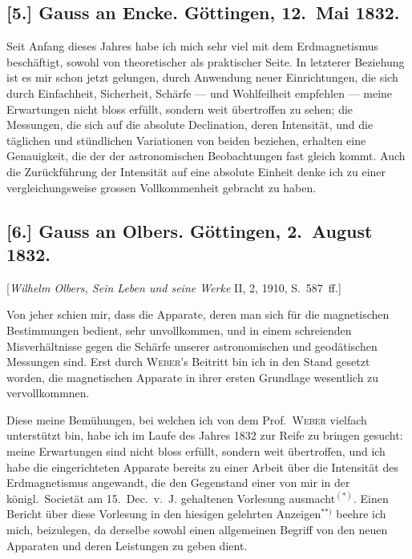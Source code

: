 \documentclass[12pt,a4paper]{article}
\begin{document}
\subsection*{[5.] Gauss an Encke. G\"ottingen, 12.~Mai 1832.}

Seit Anfang dieses Jahres habe ich mich sehr viel mit dem Erdmagnetismus besch\"aftigt, sowohl von theoretischer als praktischer Seite. In letzterer Beziehung ist es mir schon jetzt gelungen, durch Anwendung neuer Einrichtungen, die sich durch Einfachheit, Sicherheit, Sch\"arfe --- und Wohlfeilheit empfehlen --- meine Erwartungen nicht bloss erf\"ullt, sondern weit \"ubertroffen zu sehen; die Messungen, die sich auf die absolute Declination, deren Intensit\"at, und die t\"aglichen und st\"undlichen Variationen von beiden beziehen, erhalten eine Genauigkeit, die der der astronomischen Beobachtungen fast gleich kommt. Auch die Zur\"uckf\"uhrung der Intensit\"at auf eine absolute Einheit denke ich zu einer vergleichungsweise grossen Vollkommenheit gebracht zu haben.

\subsection*{[6.] Gauss an Olbers. G\"ottingen, 2.~August 1832.}

[\textit{Wilhelm Olbers, Sein Leben und seine Werke} II, 2, 1910, S.~587~ff.]

\medskip\noindent
Von jeher schien mir, dass die Apparate, deren man sich f\"ur die magnetischen Bestimmungen bedient, sehr unvollkommen, und in einem schreienden Misverh\"altnisse gegen die Sch\"arfe unserer astronomischen und geod\"atischen Messungen sind. Erst durch \textsc{Weber}'s Beitritt bin ich in den Stand gesetzt worden, die magnetischen Apparate in ihrer ersten Grundlage wesentlich zu vervollkommnen.

Diese meine Bem\"uhungen, bei welchen ich von dem Prof.~\textsc{Weber} vielfach unterst\"utzt bin, habe ich im Laufe des Jahres 1832 zur Reife zu bringen gesucht: meine Erwartungen sind nicht bloss erf\"ullt, sondern weit \"ubertroffen, und ich habe die eingerichteten Apparate bereits zu einer Arbeit \"uber die Intensit\"at des Erdmagnetismus angewandt, die den Gegenstand einer von mir in der k\"onigl.~Societ\"at am 15.~Dec.~v.~J. gehaltenen Vorlesung ausmacht$^{(*)}$. Einen Bericht \"uber diese Vorlesung in den hiesigen gelehrten Anzeigen$^{**)}$ beehre ich mich, beizulegen, da derselbe sowohl einen allgemeinen Begriff von den neuen Apparaten und deren Leistungen zu geben dient.
\end{document}
